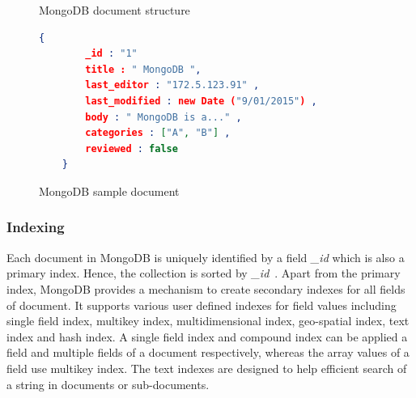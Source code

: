 \begin{figure}[h]
	\centering
	\centering
	\caption{MongoDB document structure~\citep{mongodb:org}}
	\label{fig:mongodb-doc}
	
\end{figure}

	\begin{figure}[h]
	\begin{lstlisting}[language=JSON,basicstyle=\scriptsize]
	{
		_id : "1"
		title : " MongoDB ",
		last_editor : "172.5.123.91" ,
		last_modified : new Date ("9/01/2015") ,
		body : " MongoDB is a..." ,
		categories : ["A", "B"] ,
		reviewed : false
	}
	\end{lstlisting} 
	\caption{MongoDB sample document}
	\label{sample-mongodb-document}
\end{figure}

\subsubsection{Indexing}\label{mong-xmark-indexing}

Each document in MongoDB is uniquely identified by a field \textit{\_id} which is also a primary index. Hence, the collection is sorted by \textit{\_id}~\citep{nosql/comparision}.
Apart from the primary index, MongoDB provides a mechanism to create secondary indexes for all fields of document. It supports various user defined indexes for field values including single field index, multikey index, multidimensional index, geo-spatial index, text index and hash index. A single field index and compound index can be applied a field and multiple fields of a document respectively, whereas the array values of a field use multikey index.  The text indexes are designed to help efficient search of a string in documents or sub-documents.

